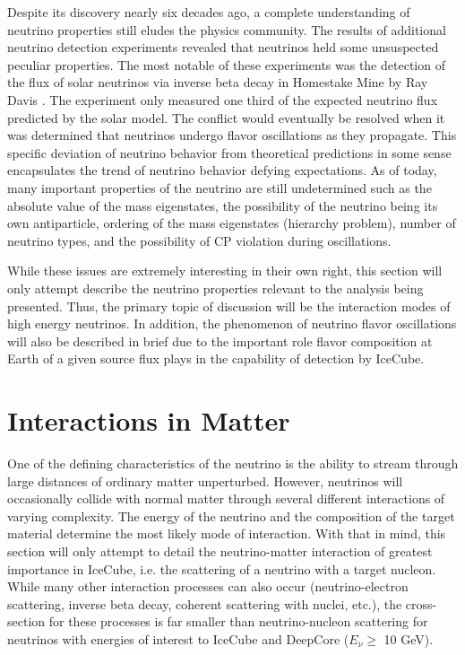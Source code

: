 \documentclass{gatech-thesis}
\begin{document}
Despite its discovery nearly six decades ago, a complete understanding of neutrino properties still eludes the physics community. The results of additional neutrino detection experiments revealed that neutrinos held some unsuspected peculiar properties. The most notable of these experiments was the detection of the flux of solar neutrinos via inverse beta decay in Homestake Mine by Ray Davis \cite{PhysRevLett.20.1205}. The experiment only measured one third of the expected neutrino flux predicted by the solar model. The conflict would eventually be resolved when it was determined that neutrinos undergo flavor oscillations as they propagate. This specific deviation of neutrino behavior from theoretical predictions in some sense encapsulates the trend of neutrino behavior defying expectations. As of today, many important properties of the neutrino are still undetermined such as the absolute value of the mass eigenstates, the possibility of the neutrino being its own antiparticle, ordering of the mass eigenstates (hierarchy problem), number of neutrino types, and the possibility of CP violation during oscillations. 

While these issues are extremely interesting in their own right, this section will only attempt describe the neutrino properties relevant to the analysis being presented. Thus, the primary topic of discussion will be the interaction modes of high energy neutrinos. In addition, the phenomenon of neutrino flavor oscillations will also be described in brief due to the important role flavor composition at Earth of a given source flux plays in the capability of detection by IceCube.

\section{Interactions in Matter}
One of the defining characteristics of the neutrino is the ability to stream through large distances of ordinary matter unperturbed. However, neutrinos will occasionally collide with normal matter through several different interactions of varying complexity. The energy of the neutrino and the composition of the target material determine the most likely mode of interaction. With that in mind, this section will only attempt to detail the neutrino-matter interaction of greatest importance in IceCube, i.e. the scattering of a neutrino with a target nucleon. While many other interaction processes can also occur (neutrino-electron scattering, inverse beta decay, coherent scattering with nuclei, etc.), the cross-section for these processes is far smaller than neutrino-nucleon scattering for neutrinos with energies of interest to IceCube and DeepCore ($E_{\nu} \geq$ 10 GeV).
\end{document}
